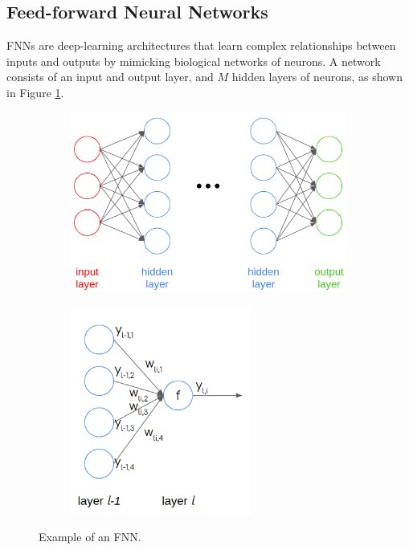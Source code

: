 \subsection{Feed-forward Neural Networks}

\Glspl*{FNN} are deep-learning architectures that learn complex relationships between inputs and outputs by mimicking biological networks of neurons.
A network consists of an input and output layer, and $M$ hidden layers of neurons, as shown in Figure \ref{fig:3-fnn}.

\begin{figure}[htbp!] %
  \centering
  \begin{subfigure}[b]{0.51\textwidth}
    \centering
    \includegraphics[width=1.0\textwidth]{figures/fnn-1}
    \caption{}
  \end{subfigure}
  \hfill
  \begin{subfigure}[b]{0.47\textwidth}
    \centering
    \includegraphics[width=0.65\textwidth]{figures/fnn-2}
    \caption{}
  \end{subfigure}
  \hfill
  \caption{Example of an FNN.}
  \label{fig:3-fnn}
\end{figure}

